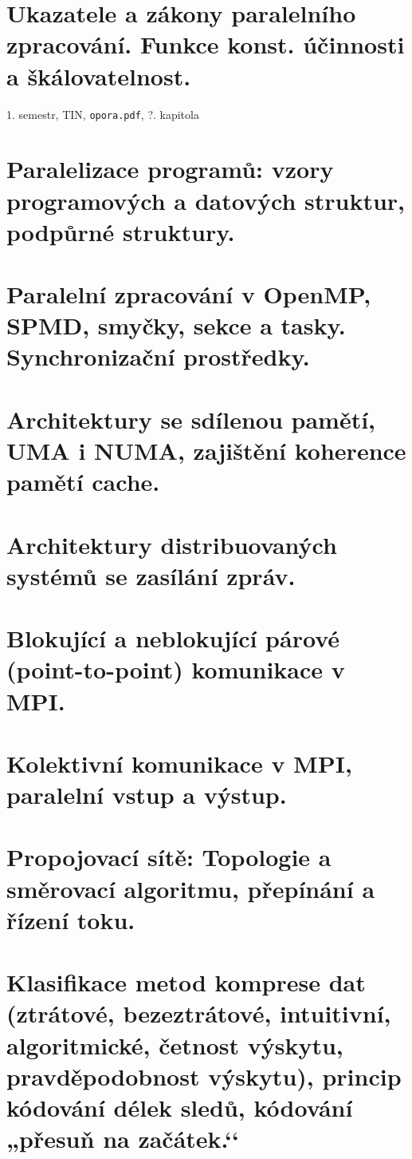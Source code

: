 \documentclass[a4paper, 11pt]{report}
\begin{document}
\chapter{Ukazatele a zákony paralelního zpracování. Funkce konst. účinnosti a škálovatelnost.} \label{cha:26}
1. semestr, TIN, \texttt{opora.pdf}, ?. kapitola

\chapter{Paralelizace programů: vzory programových a datových struktur, podpůrné struktury.} \label{cha:27}
\chapter{Paralelní zpracování v OpenMP, SPMD, smyčky, sekce a tasky. Synchronizační prostředky.} \label{cha:28}
\chapter{Architektury se sdílenou pamětí, UMA i NUMA, zajištění koherence pamětí cache.} \label{cha:29}
\chapter{Architektury distribuovaných systémů se zasílání zpráv.} \label{cha:30}
\chapter{Blokující a neblokující párové (point-to-point) komunikace v MPI.} \label{cha:31}
\chapter{Kolektivní komunikace v MPI, paralelní vstup a výstup.} \label{cha:32}
\chapter{Propojovací sítě: Topologie a směrovací algoritmu, přepínání a řízení toku.} \label{cha:33}
\chapter{Klasifikace metod komprese dat (ztrátové, bezeztrátové, intuitivní, algoritmické, četnost výskytu, pravděpodobnost výskytu), princip kódování délek sledů, kódování „přesuň na začátek.‘‘} \label{cha:34}
\end{document}
